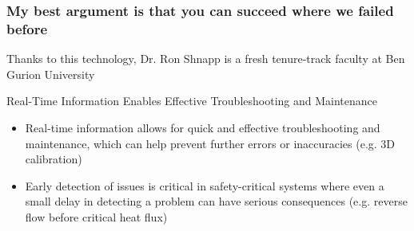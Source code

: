 



\begin{frame}[label=why-5]
\frametitle{My best argument is that you can succeed where we failed before}
\centering {}
\begin{cardTiny}
Thanks to this technology, Dr. Ron Shnapp is a fresh tenure-track faculty at Ben Gurion University
\end{cardTiny}
\end{frame}


\begin{frame}[label=why-6]{Real-Time Information Enables Effective Troubleshooting and Maintenance}

\begin{itemize}
\item Real-time information allows for quick and effective troubleshooting and maintenance, which can help prevent further errors or inaccuracies (e.g. 3D calibration)
\item Early detection of issues is critical in safety-critical systems where even a small delay in detecting a problem can have serious consequences (e.g. reverse flow before critical heat flux)
\end{itemize}

\end{frame}

